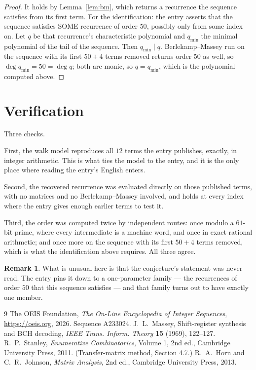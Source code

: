 \documentclass[11pt,a4paper]{article}
\theoremstyle{plain}
\theoremstyle{definition}
\newtheorem{remark}[theorem]{Remark}
\begin{document}
\begin{proof}
It holds by Lemma~\ref{lem:bm}, which returns a recurrence the sequence satisfies from its
first term. For the identification: the entry asserts that the sequence satisfies SOME
recurrence of order $50$, possibly only from some index on. Let $q$ be that recurrence's
characteristic polynomial and $q_{\min}$ the minimal polynomial of the tail of the sequence.
Then $q_{\min}\mid q$. Berlekamp--Massey run on the sequence with its first $50+4$ terms
removed returns order $50$ as well, so $\deg q_{\min}=50=\deg q$; both are monic, so
$q=q_{\min}$, which is the polynomial computed above.
\end{proof}

\section{Verification}

Three checks.

First, the walk model reproduces all $12$ terms the entry publishes, exactly, in integer
arithmetic. This is what ties the model to the entry, and it is the only place where reading
the entry's English enters.

Second, the recovered recurrence was evaluated directly on those published terms, with no
matrices and no Berlekamp--Massey involved, and holds at every index where the entry gives
enough earlier terms to test it.

Third, the order was computed twice by independent routes: once modulo a $61$-bit prime, where
every intermediate is a machine word, and once in exact rational arithmetic; and once more on
the sequence with its first $50+4$ terms removed, which is what the identification above
requires. All three agree.

\begin{remark}
What is unusual here is that the conjecture's statement was never read. The entry pins it down
to a one-parameter family --- the recurrences of order $50$ that this sequence satisfies
--- and that family turns out to have exactly one member.
\end{remark}

\begin{thebibliography}{9}
 The OEIS Foundation, \emph{The On-Line Encyclopedia of Integer
Sequences}, \url{https://oeis.org}, 2026. Sequence A233024.
 J.~L.~Massey, Shift-register synthesis and BCH decoding, \emph{IEEE
Trans. Inform. Theory} \textbf{15} (1969), 122--127.
 R.~P.~Stanley, \emph{Enumerative Combinatorics}, Volume 1, 2nd ed.,
Cambridge University Press, 2011. (Transfer-matrix method, Section 4.7.)
 R.~A.~Horn and C.~R.~Johnson, \emph{Matrix Analysis}, 2nd ed., Cambridge
University Press, 2013.
\end{thebibliography}
\end{document}
